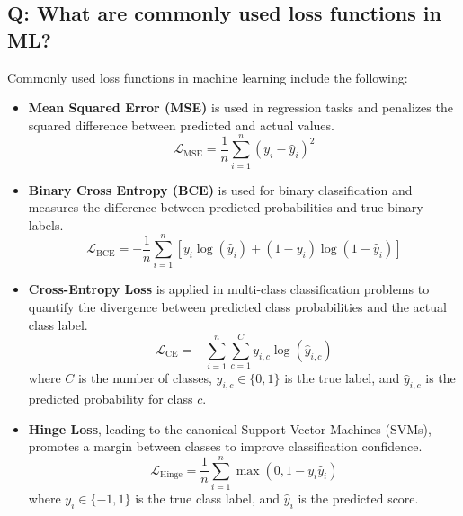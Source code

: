 \documentclass[11pt]{article}
\begin{document}
\subsection*{Q: What are commonly used loss functions in ML?}
Commonly used loss functions in machine learning include the following:
\begin{itemize}
	\item \textbf{Mean Squared Error (MSE)} is used in regression tasks and penalizes the squared difference between predicted and actual values.
	      \[
		      \mathcal{L}_{\text{MSE}} = \frac{1}{n} \sum_{i=1}^{n} (y_i - \hat{y}_i)^2
	      \]

	\item \textbf{Binary Cross Entropy (BCE)} is used for binary classification and measures the difference between predicted probabilities and true binary labels.
	      \[
		      \mathcal{L}_{\text{BCE}} = - \frac{1}{n} \sum_{i=1}^{n} \left[ y_i \log(\hat{y}_i) + (1 - y_i) \log(1 - \hat{y}_i) \right]
	      \]

	\item \textbf{Cross-Entropy Loss} is applied in multi-class classification problems to quantify the divergence between predicted class probabilities and the actual class label.
	      \[
		      \mathcal{L}_{\text{CE}} = - \sum_{i=1}^{n} \sum_{c=1}^{C} y_{i,c} \log(\hat{y}_{i,c})
	      \]
	      where \( C \) is the number of classes, \( y_{i,c} \in \{0,1\} \) is the true label, and \( \hat{y}_{i,c} \) is the predicted probability for class \( c \).

	\item \textbf{Hinge Loss}, leading to the canonical Support Vector Machines (SVMs), promotes a margin between classes to improve classification confidence.
	      \[
		      \mathcal{L}_{\text{Hinge}} = \frac{1}{n} \sum_{i=1}^{n} \max(0, 1 - y_i \hat{y}_i)
	      \]
	      where \( y_i \in \{-1, 1\} \) is the true class label, and \( \hat{y}_i \) is the predicted score.
\end{itemize}
\end{document}
